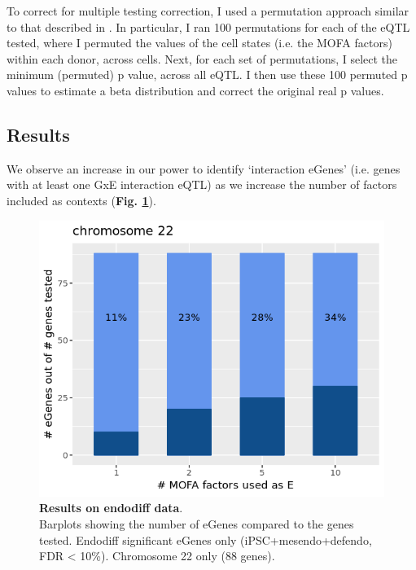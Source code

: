 To correct for multiple testing correction, I used a permutation approach similar to that described in \cite{ongen2016fast}.
In particular, I ran 100 permutations for each of the eQTL tested, where I permuted the values of the cell states (i.e. the MOFA factors) within each donor, across cells.
Next, for each set of permutations, I select the minimum (permuted) p value, across all eQTL.
I then use these 100 permuted p values to estimate a beta distribution and correct the original real p values.

\subsection{Results}

We observe an increase in our power to identify `interaction eGenes' (i.e. genes with at least one GxE interaction eQTL) as we increase the number of 
factors included as contexts 
(\textbf{Fig. \ref{fig:sc_structlmm_endo_barplots}}). \\

\begin{figure}[htbp]
\centering
\includegraphics[width=14cm]{Chapter6/Fig/sc_structlmm_endodiff_mofa.png}
\caption[Results on endodiff data]{\textbf{Results on endodiff data}.\\
Barplots showing the number of eGenes compared to the genes tested.
Endodiff significant eGenes only (iPSC+mesendo+defendo, FDR < 10\%).
Chromosome 22 only (88 genes).}
\label{fig:sc_structlmm_endo_barplots}
\end{figure}

